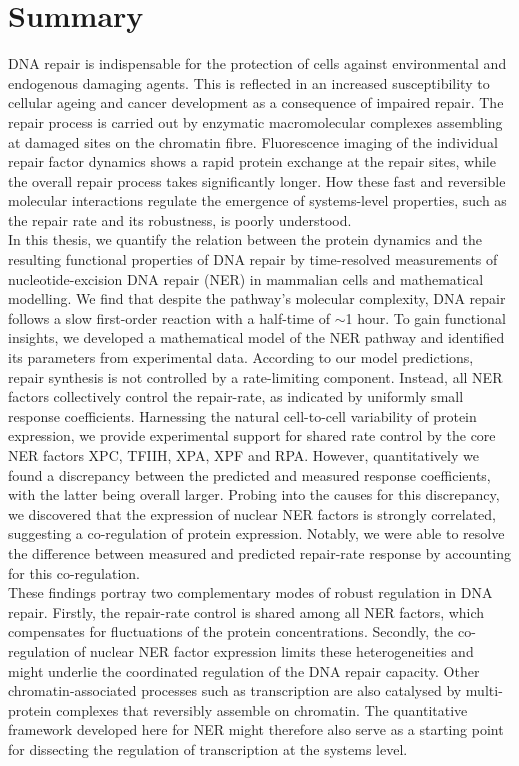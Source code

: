 \chapter*{Summary}
\thispagestyle{plain2}





DNA repair is indispensable for the protection of cells against environmental and endogenous damaging agents. This is reflected in an increased susceptibility to cellular ageing and cancer development as a consequence of impaired repair. The repair process is carried out by enzymatic macromolecular complexes assembling at damaged sites on the chromatin fibre. Fluorescence imaging of the individual repair factor dynamics shows a rapid protein exchange at the repair sites, while the overall repair process takes significantly longer. How these fast and reversible molecular interactions regulate the emergence of systems-level properties, such as the repair rate and its robustness, is poorly understood.\\ 
In this thesis, we quantify the relation between the protein dynamics and the resulting functional properties of DNA repair by time-resolved measurements of nucleotide-excision DNA repair (NER) in mammalian cells and mathematical modelling. We find that despite the pathway's molecular complexity, DNA repair follows a slow first-order reaction with a half-time of $\sim$1 hour. To gain functional insights, we developed a mathematical model of the NER pathway and identified its parameters from experimental data. According to our model predictions, repair synthesis is not controlled by a rate-limiting component. Instead, all NER factors collectively control the repair-rate, as indicated by uniformly small response coefficients. Harnessing the natural cell-to-cell variability of protein expression, we provide experimental support for shared rate control by the core NER factors XPC, TFIIH, XPA, XPF and RPA. However, quantitatively we found a discrepancy between the predicted and measured response coefficients, with the latter being overall larger. Probing into the causes for this discrepancy, we discovered that the expression of nuclear NER factors is strongly correlated, suggesting a co-regulation of protein expression. Notably, we were able to resolve the difference between measured and predicted repair-rate response by accounting for this co-regulation. \\ 
These findings portray two complementary modes of robust regulation in DNA repair. Firstly, the repair-rate control is shared among all NER factors, which compensates for fluctuations of the protein concentrations. Secondly, the co-regulation of nuclear NER factor expression limits these heterogeneities and might underlie the coordinated regulation of the DNA repair capacity. Other chromatin-associated processes such as transcription are also catalysed by multi-protein complexes that reversibly assemble on chromatin. The quantitative framework developed here for NER might therefore also serve as a starting point for dissecting the regulation of transcription at the systems level.



      
 


%